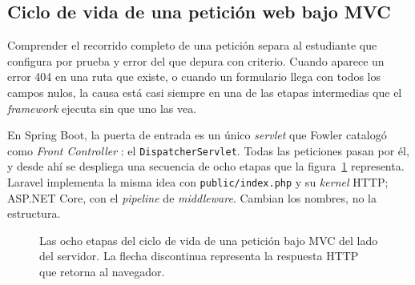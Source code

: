 \documentclass[11pt,a4paper,openany]{book}
\begin{document}
\subsection{Ciclo de vida de una petición web bajo MVC}
\label{sec:u4:ciclo}

Comprender el recorrido completo de una petición separa al estudiante que configura por prueba y error del que depura con criterio. Cuando aparece un error 404 en una ruta que existe, o cuando un formulario llega con todos los campos nulos, la causa está casi siempre en una de las etapas intermedias que el \emph{framework} ejecuta sin que uno las vea.

En Spring Boot, la puerta de entrada es un único \emph{servlet} que Fowler catalogó como \emph{Front Controller} \cite{fowler2002patterns}: el \texttt{DispatcherServlet}. Todas las peticiones pasan por él, y desde ahí se despliega una secuencia de ocho etapas que la figura~\ref{fig:u4:ciclo} representa. Laravel implementa la misma idea con \texttt{public/index.php} y su \emph{kernel} HTTP; ASP.NET Core, con el \emph{pipeline} de \emph{middleware}. Cambian los nombres, no la estructura.

\begin{figure}[htbp]
	\centering
	\caption{Las ocho etapas del ciclo de vida de una petición bajo MVC del lado del servidor. La flecha discontinua representa la respuesta HTTP que retorna al navegador.}
	\label{fig:u4:ciclo}
\end{figure}
\end{document}
